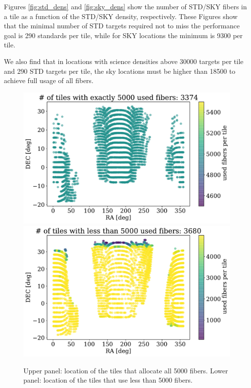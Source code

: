 \documentclass{article}
\begin{document}
Figures \ref{fig:std_dens} and \ref{fig:sky_dens} show the number of
STD/SKY fibers in a tile as a function of the STD/SKY density,
respectively.
These Figures show that the minimal number of STD targets required not
to miss the performance goal is 290 standards per tile, while for SKY locations the
minimum is 9300 per tile. 

We also find that in locations with science densities above 30000
targets per tile and 290 STD targets per tile, the sky locations must
be higher than 18500 to achieve full usage of all fibers.



\begin{figure}[!h]
\begin{center}
\begin{center}
\includegraphics[scale=0.50]{assigned_used_ra_dec_exact.pdf}
\includegraphics[scale=0.50]{assigned_used_ra_dec_below.pdf}
\end{center}
\caption{ Upper panel: location of the tiles that allocate all 5000
  fibers. 
Lower panel: location of the tiles that use less than 5000 fibers.
\label{fig:used_fibers}}
\end{center}
\end{figure}
\end{document}
